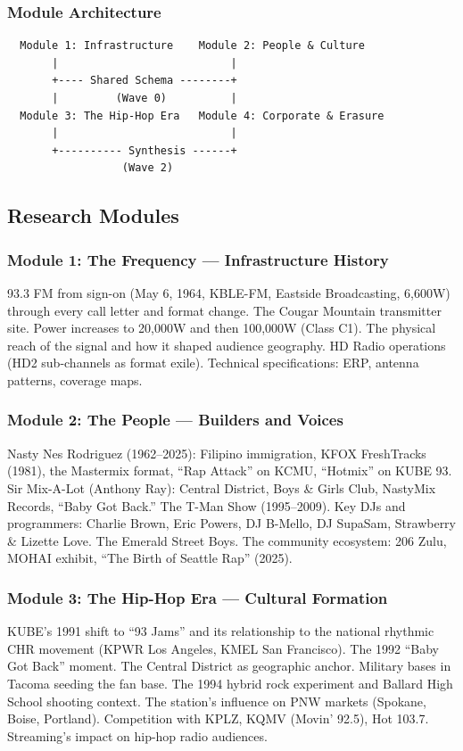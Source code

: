 \documentclass[11pt,letterpaper]{article}
\begin{document}
\subsubsection{Module Architecture}

\begin{asciibox}
\begin{verbatim}
  Module 1: Infrastructure    Module 2: People & Culture
       |                           |
       +---- Shared Schema --------+
       |         (Wave 0)          |
  Module 3: The Hip-Hop Era   Module 4: Corporate & Erasure
       |                           |
       +---------- Synthesis ------+
                  (Wave 2)
\end{verbatim}
\end{asciibox}

\subsection{Research Modules}

\subsubsection{Module 1: The Frequency --- Infrastructure History}
93.3 FM from sign-on (May 6, 1964, KBLE-FM, Eastside Broadcasting, 6,600W) through every call letter and format change. The Cougar Mountain transmitter site. Power increases to 20,000W and then 100,000W (Class C1). The physical reach of the signal and how it shaped audience geography. HD Radio operations (HD2 sub-channels as format exile). Technical specifications: ERP, antenna patterns, coverage maps.

\subsubsection{Module 2: The People --- Builders and Voices}
Nasty Nes Rodriguez (1962--2025): Filipino immigration, KFOX FreshTracks (1981), the Mastermix format, ``Rap Attack'' on KCMU, ``Hotmix'' on KUBE 93. Sir Mix-A-Lot (Anthony Ray): Central District, Boys \& Girls Club, NastyMix Records, ``Baby Got Back.'' The T-Man Show (1995--2009). Key DJs and programmers: Charlie Brown, Eric Powers, DJ B-Mello, DJ SupaSam, Strawberry \& Lizette Love. The Emerald Street Boys. The community ecosystem: 206 Zulu, MOHAI exhibit, ``The Birth of Seattle Rap'' (2025).

\subsubsection{Module 3: The Hip-Hop Era --- Cultural Formation}
KUBE's 1991 shift to ``93 Jams'' and its relationship to the national rhythmic CHR movement (KPWR Los Angeles, KMEL San Francisco). The 1992 ``Baby Got Back'' moment. The Central District as geographic anchor. Military bases in Tacoma seeding the fan base. The 1994 hybrid rock experiment and Ballard High School shooting context. The station's influence on PNW markets (Spokane, Boise, Portland). Competition with KPLZ, KQMV (Movin' 92.5), Hot 103.7. Streaming's impact on hip-hop radio audiences.
\end{document}
